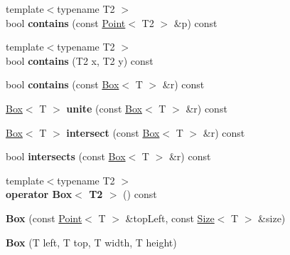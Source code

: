 \begin{DoxyCompactItemize}
\item 
\hypertarget{class_box_a349c282feb79bd25acd2e019e324cb29}{
{\footnotesize template$<$typename T2 $>$ }\\bool {\bfseries contains} (const \hyperlink{class_point}{Point}$<$ T2 $>$ \&p) const }
\label{class_box_a349c282feb79bd25acd2e019e324cb29}

\item 
\hypertarget{class_box_ac9591ddb1c83a71913baaa7339b6b320}{
{\footnotesize template$<$typename T2 $>$ }\\bool {\bfseries contains} (T2 x, T2 y) const }
\label{class_box_ac9591ddb1c83a71913baaa7339b6b320}

\item 
\hypertarget{class_box_add30ee8481bd46e34b4f3a63a126712a}{
bool {\bfseries contains} (const \hyperlink{class_box}{Box}$<$ T $>$ \&r) const }
\label{class_box_add30ee8481bd46e34b4f3a63a126712a}

\item 
\hypertarget{class_box_aeed25d0e0ffb49e8e77ca3bd36509017}{
\hyperlink{class_box}{Box}$<$ T $>$ {\bfseries unite} (const \hyperlink{class_box}{Box}$<$ T $>$ \&r) const }
\label{class_box_aeed25d0e0ffb49e8e77ca3bd36509017}

\item 
\hypertarget{class_box_a88cd9779de891c4c86f5a6ebc53f6e16}{
\hyperlink{class_box}{Box}$<$ T $>$ {\bfseries intersect} (const \hyperlink{class_box}{Box}$<$ T $>$ \&r) const }
\label{class_box_a88cd9779de891c4c86f5a6ebc53f6e16}

\item 
\hypertarget{class_box_aac069f504fa8b0efde1817ec25bf72ca}{
bool {\bfseries intersects} (const \hyperlink{class_box}{Box}$<$ T $>$ \&r) const }
\label{class_box_aac069f504fa8b0efde1817ec25bf72ca}

\item 
\hypertarget{class_box_a59ff93ffee6386885d5eb5cb13610b95}{
{\footnotesize template$<$typename T2 $>$ }\\{\bfseries operator Box$<$ T2 $>$} () const }
\label{class_box_a59ff93ffee6386885d5eb5cb13610b95}

\item 
\hypertarget{class_box_ad8f5cd82926a0d9249167b4c1e4be4cc}{
{\bfseries Box} (const \hyperlink{class_point}{Point}$<$ T $>$ \&topLeft, const \hyperlink{class_size}{Size}$<$ T $>$ \&size)}
\label{class_box_ad8f5cd82926a0d9249167b4c1e4be4cc}

\item 
\hypertarget{class_box_adacfc3678389e68945da2976da8693ec}{
{\bfseries Box} (T left, T top, T width, T height)}
\label{class_box_adacfc3678389e68945da2976da8693ec}


\end{DoxyCompactItemize}
